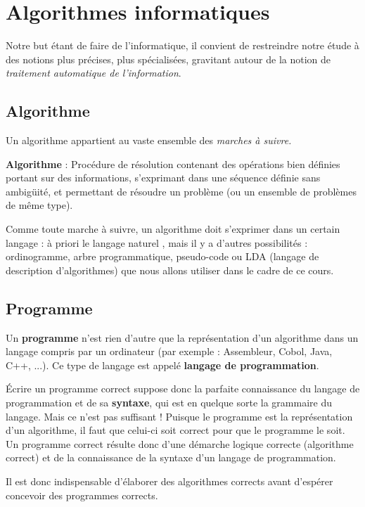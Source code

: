 \section{Algorithmes informatiques}

	Notre but étant de faire de l’informatique, il convient de restreindre
	notre étude à des notions plus précises, plus spécialisées, gravitant
	autour de la notion de \textit{traitement automatique de
	l’information}.

	\subsection{Algorithme}

		Un algorithme appartient au vaste ensemble des \textit{marches à
		suivre.}

		\textbf{Algorithme} : Procédure de résolution contenant des opérations
		bien définies portant sur des informations, s’exprimant dans une
		séquence définie sans ambigüité, et permettant de résoudre un problème
		(ou un ensemble de problèmes de même type).
	
		Comme toute marche à suivre, un algorithme doit s’exprimer dans un
		certain langage : à priori le langage naturel , mais il y a d’autres
		possibilités : ordinogramme, arbre programmatique, pseudo-code ou LDA
		(langage de description d’algorithmes) que nous allons utiliser dans le
		cadre de ce cours.

	\subsection{Programme}

		Un \textbf{programme} n’est rien d’autre que la représentation d’un
		algorithme dans un langage compris par un ordinateur (par exemple :
		Assembleur, Cobol, Java, 
		C++, ...). Ce type de langage est appelé \textbf{langage de
		programmation}.
		
		Écrire un programme correct suppose donc la parfaite connaissance du
		langage de programmation et de sa \textbf{syntaxe}, qui est en quelque
		sorte la grammaire du langage. Mais ce n’est pas suffisant ! Puisque le
		programme est la représentation d’un algorithme, il faut que celui-ci
		soit correct pour que le programme le soit. Un programme correct
		résulte donc d’une démarche logique correcte (algorithme correct) et de
		la connaissance de la syntaxe d’un langage de programmation.
		
		Il est donc indispensable d’élaborer des algorithmes corrects avant
		d’espérer concevoir des programmes corrects.

